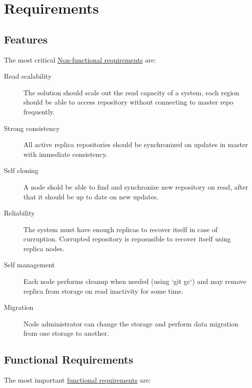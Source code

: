 \documentclass[12pt,oneside]{article}
\begin{document}
\section{Requirements}
\label{sec:requirements}

\subsection{Features}
\label{sec:features}

The most critical
\href{https://en.wikipedia.org/wiki/Non-functional_requirement}{Non-functional requirements}
are:

\begin{description}
  \item[Read scalability]
    The solution should scale out the read capacity of a system, each region should be able
    to access repository without connecting to master repo frequently.
  \item[Strong consistency]
    All active replica repositories should be synchronized on updates in master
    with immediate consistency.
  \item[Self cloning]
    A node shold be able to find and synchronize new repository on read,
    after that it should be up to date on new updates.
  \item[Reliability]
    The system must have enough replicas to recover itself in case of curruption.
    Corrupted repository is reposnsible to recover itself using replica nodes.
  \item[Self management]
    Each node performs cleanup when needed (using `git gc`) and may remove replica
    from storage on read inactivity for some time.
  \item[Migration]
    Node administrator can change the storage and perform data migration from one storage
    to another.
\end{description}

\subsection{Functional Requirements}
\label{sec:nfr}

The most important \href{https://en.wikipedia.org/wiki/Functional_requirement}{functional requirements} are:
\end{document}
